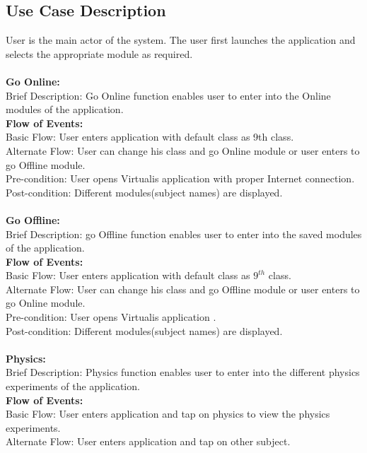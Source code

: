 \documentclass[12pt]{report}
\begin{document}
\subsection{Use Case Description}
User is the main actor of the system. The user first launches the application and selects the 
appropriate module as required. 
\\
\\
\textbf{Go Online: }\\
Brief Description: Go Online  function enables user to enter into the Online modules of the application. \\ 
\textbf{Flow of Events:} \\
\indent  Basic Flow: User enters application with default class as 9th class. \\
\indent	Alternate Flow: User can change his class and go Online module or user enters to go Offline module.\\
Pre-condition: User opens Virtualis application with proper Internet connection.\\
Post-condition: Different modules(subject names) are displayed.\\\\
\textbf{Go Offline:}\\
Brief Description: go Offline  function enables user to enter into the saved modules of the application. \\
\textbf{Flow of Events: }\\
\indent Basic Flow: User enters application with default class as \begin{math} 9^{th} \end{math} class. \\
\indent Alternate Flow: User can change his class and go Offline module  or user enters to go Online module. \\
Pre-condition: User opens Virtualis application . \\
Post-condition: Different modules(subject names) are displayed. 
\\
\\
\textbf{Physics: }\\
Brief Description: Physics function enables user to enter into the different physics experiments of the application. \\
\textbf{Flow of Events: }\\
\indent	 Basic Flow: User enters application and tap on physics to view the physics experiments.\\
\indent	Alternate Flow: User enters application and tap on other subject.\\ 
\end{document}
